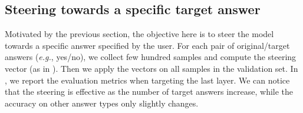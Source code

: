 \begin{table}[h]
    \centering
    \small
    \caption{\textbf{Steering MLLMs answers.} Steering answers from "Yes" (Yes/No), "1" (Number), "White" (Other) to "No", "3", "Black" respectively. The number of original/target answer counts decreases/increases significantly, while the accuracy on other answer types changes slightly, and the number of answer type counts remains almost constant.}
    \label{tab:model_steering_answers}
\end{table}



\subsection{Steering towards a specific target answer}\label{sec:model_steering_towards_specific_answers}
Motivated by the previous section, the objective here is to steer the model towards a specific answer specified by the user. For each pair of original/target answers (\emph{e.g.}, yes/no), we collect few hundred samples and compute the steering vector (as in ). Then we apply the vectors on all samples in the validation set. In , we report the evaluation metrics when targeting the last layer. We can notice that the steering is effective as the number of target answers increase, while the accuracy on other answer types only slightly changes.

